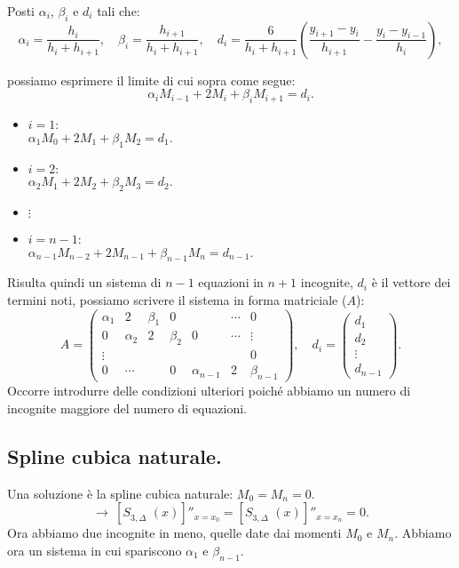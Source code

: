 Posti $\alpha_i$, $\beta_i$ e $d_i$ tali che:
\[
\alpha_i = \frac{h_{i}}{h_{i}+h_{i+1}}, \quad\beta_i =\frac{h_{i+1}}{h_i+h_{i+1}},
\quad d_i = \frac{6}{h_{i}+h_{i+1}}\left(\frac{y_{i+1} -y_{i}}{h_{i+1}} - 
\frac{y_{i} -y_{i-1}}{h_{i}}\right),
\]

possiamo esprimere il limite di cui sopra come segue:
\[\alpha_i M_{i-1} + 2M_i + \beta_iM_{i+1} = d_i.\]

\begin{itemize}
\item[] $i = 1$:\\
$\alpha_1 M_0 + 2M_1 + \beta_1M_2 = d_1.$
\item[] $i = 2$:\\
$\alpha_2 M_1 + 2M_2 + \beta_2M_3 = d_2.$
\item[]$\vdots$
\item[]$i = n-1$:\\
$\alpha_{n-1} M_{n-2} + 2M_{n-1} + \beta_{n-1}M_{n} = d_{n-1}.$
\end{itemize}

Risulta quindi un sistema di $n-1$ equazioni in $n+1$ incognite, $d_i$ è il
vettore dei termini noti, possiamo scrivere il sistema in forma matriciale
($A$):
\[A = \left(
\begin{array}{ccccccc}
\alpha_1 & 2 & \beta_1 & 0 & &\cdots & 0 \\
0 & \alpha_2 & 2 & \beta_2 &0&\cdots & \vdots \\
\vdots & & & & & & 0\\
0 & \cdots & &0 &\alpha_{n-1} & 2& \beta_{n-1}
\end{array}
\right), \quad d_i =
\left(\begin{array}{c}
d_1 \\
d_2 \\
\vdots \\
d_{n-1}
\end{array}
\right).\]
Occorre introdurre delle condizioni ulteriori poiché abbiamo un numero di
incognite maggiore del numero di equazioni. 

\subsection{Spline cubica naturale.}
Una soluzione è la spline cubica
naturale: $M_0 = M_n = 0$.
\[
\longrightarrow \ \left[S_{3,\Delta}^{\phantom{(1)}}(x) \right]''_{x = x_0}
= \left[S_{3,\Delta}^{\phantom{(1)}}(x) \right]''_{x = x_n} = 0.
\]
Ora abbiamo due incognite in meno, quelle date dai momenti $M_0$ e $M_n$.
Abbiamo ora un sistema in cui spariscono $\alpha_1$ e $\beta_{n-1}$.

